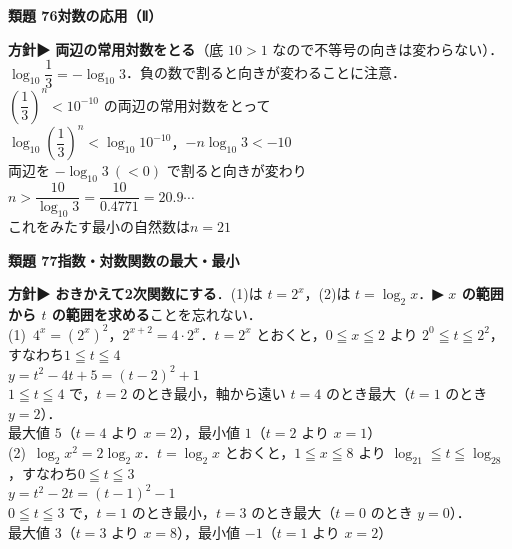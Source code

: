 \documentclass[a4paper,11pt]{ltjsarticle}
\newcommand{\ans}[2]{\Needspace{5\baselineskip}\vspace{6pt}%
  {\sffamily\bfseries 類題 #1\quad #2}\par}
\newcommand{\point}[1]{\textsf{\bfseries ▶ #1}}
\begin{document}
\ans{76}{対数の応用（Ⅱ）}
\begin{kai}
\textbf{方針}\quad \point{両辺の常用対数をとる}（底 $10>1$ なので不等号の向きは変わらない）．$\log_{10}\dfrac13=-\log_{10}3$．負の数で割ると向きが変わることに注意．\\[2pt]
$\left(\dfrac13\right)^n<10^{-10}$ の両辺の常用対数をとって\\
\hspace*{1.5em}$\log_{10}\left(\dfrac13\right)^n<\log_{10}10^{-10}$，\quad $-n\log_{10}3<-10$\\
両辺を $-\log_{10}3\ (<0)$ で割ると向きが変わり\\
\hspace*{1.5em}$n>\dfrac{10}{\log_{10}3}=\dfrac{10}{0.4771}=20.9\cdots$\\
これをみたす最小の自然数は\quad $n=21$
\end{kai}

\ans{77}{指数・対数関数の最大・最小}
\begin{kai}
\textbf{方針}\quad \point{おきかえて2次関数にする}．(1)は $t=2^x$，(2)は $t=\log_2x$．\point{$x$ の範囲から $t$ の範囲を求める}ことを忘れない．\\[2pt]
(1)\ $4^x=(2^x)^2$，$2^{x+2}=4\cdot2^x$．$t=2^x$ とおくと，$0\leqq x\leqq2$ より $2^0\leqq t\leqq2^2$，すなわち\quad $1\leqq t\leqq4$\\
\hspace*{1.5em}$y=t^2-4t+5=(t-2)^2+1$\\
\hspace*{1.5em}$1\leqq t\leqq4$ で，$t=2$ のとき最小，軸から遠い $t=4$ のとき最大（$t=1$ のとき $y=2$）．\\
\hspace*{1.5em}最大値 $5$（$t=4$ より $x=2$），\quad 最小値 $1$（$t=2$ より $x=1$）\\[2pt]
(2)\ $\log_2x^2=2\log_2x$．$t=\log_2x$ とおくと，$1\leqq x\leqq8$ より $\log_21\leqq t\leqq\log_28$，すなわち\quad $0\leqq t\leqq3$\\
\hspace*{1.5em}$y=t^2-2t=(t-1)^2-1$\\
\hspace*{1.5em}$0\leqq t\leqq3$ で，$t=1$ のとき最小，$t=3$ のとき最大（$t=0$ のとき $y=0$）．\\
\hspace*{1.5em}最大値 $3$（$t=3$ より $x=8$），\quad 最小値 $-1$（$t=1$ より $x=2$）
\end{kai}
\end{document}
